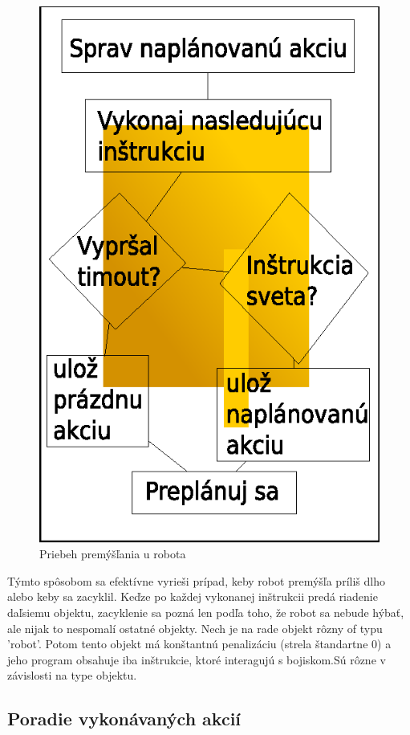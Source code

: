 \begin{figure}
\centering
\includegraphics[totalheight=0.2\textheight,width=.2\textwidth]{thinking}
\caption {Priebeh premýšľania u robota}
\label{thinking}
\end{figure}

Týmto spôsobom sa efektívne vyrieši prípad, keby robot premýšľa príliš dlho alebo keby sa zacyklil. Keďze po každej vykonanej inštrukcii predá riadenie daľsiemu objektu, zacyklenie sa pozná len podľa toho, že robot sa nebude hýbať, ale nijak to nespomalí ostatné objekty.%
\newline
Nech je na rade objekt rôzny of typu 'robot'. Potom tento objekt má konštantnú penalizáciu (strela štandartne 0) a jeho program obsahuje iba inštrukcie, ktoré interagujú s bojiskom.Sú rôzne v závislosti na type objektu.

\subsection{Poradie vykonávaných akcií}

